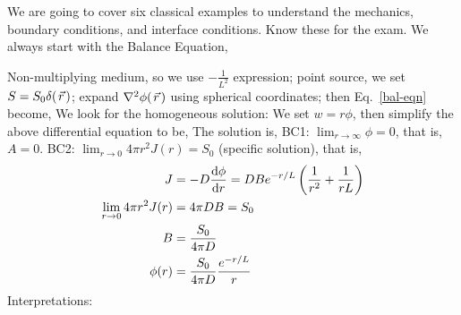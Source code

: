 \documentclass{school-22.211-notes}
\date{April 4, 2012}
\begin{document}
\maketitle

We are going to cover six classical examples to understand the mechanics, boundary conditions, and interface conditions. Know these for the exam. We always start with the Balance Equation,

Non-multiplying medium, so we use $-\frac{1}{L^2}$ expression; point source, we set $S = S_0 \delta(\left.\vec{r}\right.)$; expand $\nabla^2 \phi(\left.\vec{r}\right.)$ using spherical coordinates; then Eq.~\ref{bal-eqn} become,
We look for the homogeneous solution: 
We set $w = r \phi$, then simplify the above differential equation to be,
The solution is, 
BC1: $\lim_{r\to \infty} \phi = 0$, that is, $A=0$. BC2: $\lim_{r\to 0} 4 \pi r^2 J(r) = S_0$ (specific solution), that is, 
\begin{align}
J &= -D \frac{\mathrm{d}\phi}{\mathrm{d}r} = DBe^{-r/L} \left( \frac{1}{r^2} + \frac{1}{rL} \right) \\
\lim_{r\to 0} 4 \pi r^2 J(r) &= 4 \pi DB = S_0 \\
B &= \frac{S_0}{4 \pi D} \\
\phi(r) &= \frac{S_0}{4\pi D} \frac{e^{-r/L}}{r} 
\end{align}
Interpretations:
\end{document}
